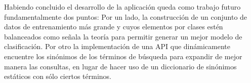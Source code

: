 Habiendo concluido el desarrollo de la aplicación queda como trabajo futuro fundamentalmente dos puntos: Por un lado, la construcción de un conjunto de datos de entrenamiento más grande y cuyos elementos por clases estén balanceados como señala la teoría para permitir generar un mejor modelo de clasificación. Por otro la implementación de una API que dinámicamente encuentre los sinónimos de los términos de búsqueda para expandir de mejor manera las consultas, en lugar de hacer uso de un diccionario de sinónimos estáticos con sólo ciertos términos.

	





